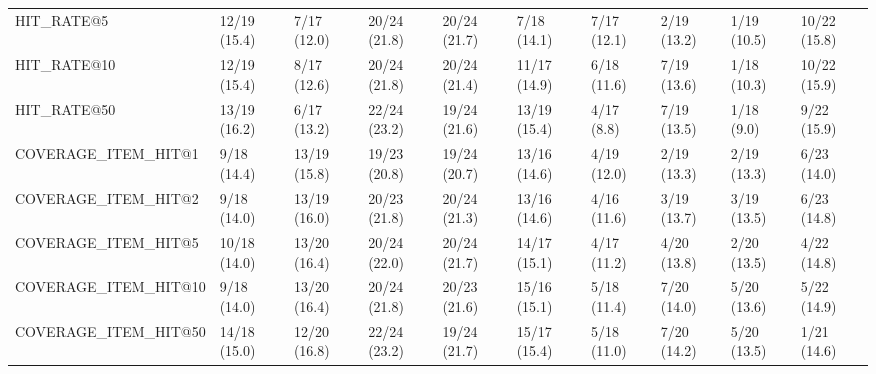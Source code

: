 \begin{tabular}{llllllllll}
HIT_RATE@5                  &   12/19 (15.4) &    7/17 (12.0) &      20/24 (21.8) &   20/24 (21.7) &   7/18 (14.1) &    7/17 (12.1) &         2/19 (13.2) &  1/19 (10.5) &  10/22 (15.8) \\
HIT_RATE@10                 &   12/19 (15.4) &    8/17 (12.6) &      20/24 (21.8) &   20/24 (21.4) &  11/17 (14.9) &    6/18 (11.6) &         7/19 (13.6) &  1/18 (10.3) &  10/22 (15.9) \\
HIT_RATE@50                 &   13/19 (16.2) &    6/17 (13.2) &      22/24 (23.2) &   19/24 (21.6) &  13/19 (15.4) &     4/17 (8.8) &         7/19 (13.5) &   1/18 (9.0) &   9/22 (15.9) \\
COVERAGE_ITEM_HIT@1         &    9/18 (14.4) &   13/19 (15.8) &      19/23 (20.8) &   19/24 (20.7) &  13/16 (14.6) &    4/19 (12.0) &         2/19 (13.3) &  2/19 (13.3) &   6/23 (14.0) \\
COVERAGE_ITEM_HIT@2         &    9/18 (14.0) &   13/19 (16.0) &      20/23 (21.8) &   20/24 (21.3) &  13/16 (14.6) &    4/16 (11.6) &         3/19 (13.7) &  3/19 (13.5) &   6/23 (14.8) \\
COVERAGE_ITEM_HIT@5         &   10/18 (14.0) &   13/20 (16.4) &      20/24 (22.0) &   20/24 (21.7) &  14/17 (15.1) &    4/17 (11.2) &         4/20 (13.8) &  2/20 (13.5) &   4/22 (14.8) \\
COVERAGE_ITEM_HIT@10        &    9/18 (14.0) &   13/20 (16.4) &      20/24 (21.8) &   20/23 (21.6) &  15/16 (15.1) &    5/18 (11.4) &         7/20 (14.0) &  5/20 (13.6) &   5/22 (14.9) \\
COVERAGE_ITEM_HIT@50        &   14/18 (15.0) &   12/20 (16.8) &      22/24 (23.2) &   19/24 (21.7) &  15/17 (15.4) &    5/18 (11.0) &         7/20 (14.2) &  5/20 (13.5) &   1/21 (14.6) \\
\bottomrule
\end{tabular}
